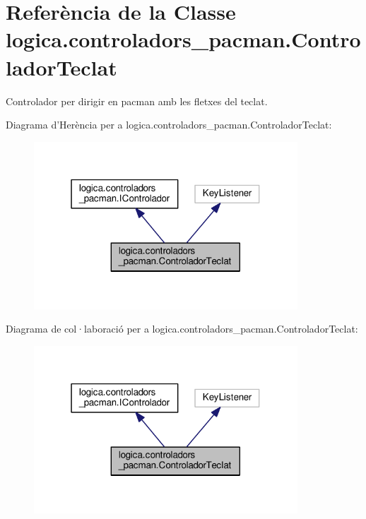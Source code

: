 \hypertarget{classlogica_1_1controladors__pacman_1_1_controlador_teclat}{\section{Referència de la Classe logica.\+controladors\+\_\+pacman.\+Controlador\+Teclat}
\label{classlogica_1_1controladors__pacman_1_1_controlador_teclat}
}


Controlador per dirigir en pacman amb les fletxes del teclat.  




Diagrama d'Herència per a logica.\+controladors\+\_\+pacman.\+Controlador\+Teclat\+:\nopagebreak
\begin{figure}[H]
\begin{center}
\leavevmode
\includegraphics[width=280pt]{classlogica_1_1controladors__pacman_1_1_controlador_teclat__inherit__graph}
\end{center}
\end{figure}


Diagrama de col·laboració per a logica.\+controladors\+\_\+pacman.\+Controlador\+Teclat\+:\nopagebreak
\begin{figure}[H]
\begin{center}
\leavevmode
\includegraphics[width=280pt]{classlogica_1_1controladors__pacman_1_1_controlador_teclat__coll__graph}
\end{center}
\end{figure}
